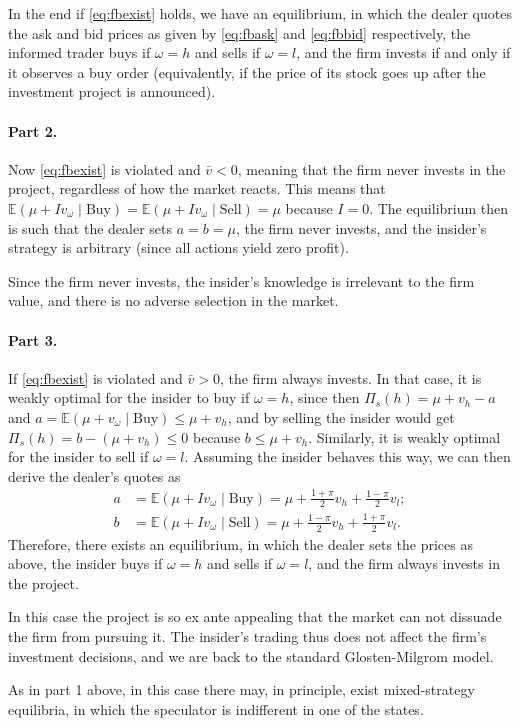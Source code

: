 \begin{solution}
\begin{enumerate}[label=(\alph{enumi})]
		In the end if \eqref{eq:fbexist} holds, we have an equilibrium, in which the dealer quotes the ask and bid prices as given by \eqref{eq:fbask} and \eqref{eq:fbbid} respectively, the informed trader buys if $\omega=h$ and sells if $\omega=l$, and the firm invests if and only if it observes a buy order (equivalently, if the price of its stock goes up after the investment project is announced).
	\end{enumerate}
	
	
	\paragraph{Part 2.}
	Now \eqref{eq:fbexist} is violated and $\bar{v} < 0$, meaning that the firm never invests in the project, regardless of how the market reacts. This means that $\mathbb{E} \left( \mu + Iv_\omega \mid \text{Buy} \right) = \mathbb{E} \left( \mu + Iv_\omega \mid \text{Sell} \right) = \mu$ because $I=0$. The equilibrium then is such that the dealer sets $a=b=\mu$, the firm never invests, and the insider's strategy is arbitrary (since all actions yield zero profit).
	
	Since the firm never invests, the insider's knowledge is irrelevant to the firm value, and there is no adverse selection in the market.
	
	\paragraph{Part 3.}
	If \eqref{eq:fbexist} is violated and $\bar{v} > 0$, the firm always invests. In that case, it is weakly optimal for the insider to buy if $\omega=h$, since then $\Pi_s(h) = \mu+v_h - a$ and $a = \mathbb{E} (\mu + v_\omega \mid \text{Buy}) \leq \mu + v_h$, and by selling the insider would get $\Pi_s(h) = b-(\mu+v_h) \leq 0$ because $b \leq \mu + v_h$. Similarly, it is weakly optimal for the insider to sell if $\omega=l$. Assuming the insider behaves this way, we can then derive the dealer's quotes as
	\begin{align*}
		a &= \mathbb{E}(\mu + I v_\omega \mid \text{Buy}) = \mu + \frac{1+\pi}{2} v_h + \frac{1-\pi}{2} v_l;
		\\
		b &= \mathbb{E}(\mu + I v_\omega \mid \text{Sell}) = \mu + \frac{1-\pi}{2} v_h + \frac{1+\pi}{2} v_l.
	\end{align*}
	Therefore, there exists an equilibrium, in which the dealer sets the prices as above, the insider buys if $\omega=h$ and sells if $\omega=l$, and the firm always invests in the project. 
	
	In this case the project is so ex ante appealing that the market can not dissuade the firm from pursuing it. The insider's trading thus does not affect the firm's investment decisions, and we are back to the standard Glosten-Milgrom model.
	
	As in part 1 above, in this case there may, in principle, exist mixed-strategy equilibria, in which the speculator is indifferent in one of the states.
\end{solution}




